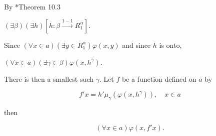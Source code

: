 By *Theorem 10.3

$(\exists \beta)(\exists h)[h: \beta \xrightarrow{1-1} R_1^\alpha].$

Since $(\forall x \in a)(\exists y \in R_1^\alpha) \varphi(x, y)$ and since $h$ is onto,

$(\forall x \in a)(\exists \gamma \in \beta) \varphi(x, h^\gamma).$

There is then a smallest such $\gamma$. Let $f$ be a function defined on $a$ by

$$f'x = h' \mu_\gamma(\varphi(x, h^\gamma)), \quad x \in a$$

then

$$(\forall x \in a) \varphi(x, f'x).$$
